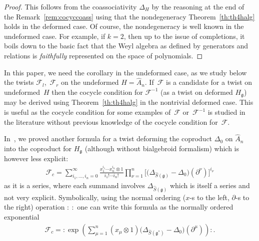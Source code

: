 \documentclass[10pt,a4paper]{amsart}
\def\gg{\mathfrak{g}}
\numberwithin{equation}{section}
\begin{document}
\begin{proof}This follows from the coassociativity $\Delta_H$ by the reasoning at the end of the Remark~\ref{rem:cocyccoass} using that the nondegeneracy Theorem~\ref{th:th4halg} holds in the deformed case. Of course, the nondegeneracy is well known in the undeformed case. For example, if $k=2$, then up to the issue of completions, it boils down to the basic fact that the Weyl algebra as defined by generators and relations is {\em faithfully} represented on the space of polynomials.
\end{proof}

In this paper, we need the corollary in the undeformed case, as we study below the twists $\mathcal{F}_l$,~$\mathcal{F}_r$ on the undeformed $H = \hat{A}_n$. If~$\mathcal{F}$ is a candidate for a twist on undeformed~$H$ then the cocycle condition for $\mathcal{F}^{-1}$ (as a twist on deformed $H_\gg$) may be derived using Theorem~\ref{th:th4halg} in the nontrivial deformed case. This is useful as the cocycle condition for some examples of~$\mathcal{F}$ or~$\mathcal{F}^{-1}$ is studied in the literature without previous knowledge of the cocycle condition for~$\mathcal{F}$.

In~\cite{scopr}, we proved another formula for a twist deforming the coproduct $\Delta_0$ on $\hat{A}_n$ into the coproduct for $H_\gg$ (although without bialgebroid formalism) which is however less explicit:
\begin{gather}\label{eq:Fc}
\mathcal{F}_c = \sum_{i_1,\dots,i_n = 0}^\infty \frac{x_1^{i_1}\cdots x_n^{i_n}\otimes 1}{i_1!\cdots i_n!}\prod_{\nu = 1}^n\big[\big(\Delta_{\hat{S}(\gg)} - \Delta_0\big)(\partial^\nu)\big]^{i_\nu}
\end{gather}
as it is a series, where each summand involves $\Delta_{\hat{S}(\gg)}$ which is itself a series and not very explicit. Symbolically, using the normal ordering ($x$-s to the left, $\partial$-s to the right) operation ${:} \ {:}$ one can write this formula as the normally ordered exponential \begin{gather*}
\mathcal{F}_c = {:}\exp\left(\sum_{\mu = 1}^n (x_\mu\otimes 1)\big(\Delta_{\hat{S}(\gg^*)}-\Delta_0\big)(\partial^\mu)\right){:}.
\end{gather*}
\end{document}
